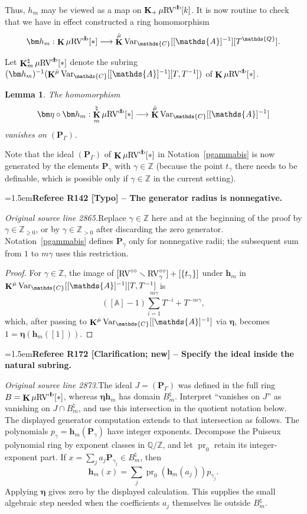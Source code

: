 \documentclass[12pt]{amsart}
\newcommand{\RefereeRemark}[4]{%
  \par\medskip\begingroup\normalfont\small\color{RefereePurple}%
  \emergencystretch=1.5em\noindent\textbf{Referee R#1 [#2] -- #3.}\par\nobreak\noindent #4\par
  \endgroup\medskip
}
\theoremstyle{plain}
\newtheorem{lem}[thm]{Lemma}
\theoremstyle{definition}
\theoremstyle{remark}
\numberwithin{equation}{section}
\theoremstyle{plain}
\newcommand{\RV}{\textup{RV}}
\newcommand{\Z}{\mathds{Z}}
\newcommand{\A}{\mathds{A}}
\newcommand{\C}{\mathds{C}}
\newcommand{\Q}{\mathds{Q}}
\newcommand{\0}{\emptyset}
\newcommand{\fun}{\longrightarrow}
\newcommand{\mi}{\smallsetminus}
\newcommand{\mgRV}{{\mu}{\RV}}
\DeclareMathOperator{\gsk}{\mathbf{K}_+}
\DeclareMathOperator{\ggk}{\mathbf{K}}
\DeclareMathOperator{\db}{d \! b}
\newcommand{\var}{\textup{Var}}
\newcommand{\gmv}{\ggk^{\hat \mu}\var_{\C}}
\begin{document}
Thus, $h_m$ may be viewed as a map on $\gsk \mgRV^{\db}[k]$. It is now routine to check that  we have in effect constructed a ring homomorphism
\[
\bm h_m : \ggk \mgRV^{\db}[*] \fun  \ggk^{\hat \mu} \var_{\C}[[\A]^{-1}][T^{\Q}].
\]

Let $\ggk^\natural_m \mgRV^{\db}[*]$ denote the subring $(\bm h_m)^{-1}(\gmv[[\A]^{-1}][T, T^{-1}])$ of $\ggk \mgRV^{\db}[*]$.

\begin{lem}\label{PG:van}
The homomorphism
\[
\bm \eta \circ \bm h_m : \ggk^\natural_m \mgRV^{\db}[*] \fun \gmv[[\A]^{-1}]
\]
vanishes on $(\bm P_{\Gamma})$.
\end{lem}
Note that the ideal $(\bm P_\Gamma)$ of $\ggk \mgRV^{\db}[*]$ in Notation~\ref{pgammabis} is now generated by the elements $\bm P_\gamma$ with $\gamma \in \Z$ (because the point $t_\gamma$ there needs to be definable, which is possible only if $\gamma \in \Z$ in the current setting).

\RefereeRemark{142}{Typo}{The generator radius is nonnegative}{%
\textit{Original source line 2865.}\quad Replace $\gamma\in\Z$ here and at the beginning of the proof by $\gamma\in\Z_{\geq0}$, or by $\gamma\in\Z_{>0}$ after discarding the zero generator. Notation~\ref{pgammabis} defines $\bm P_\gamma$ only for nonnegative radii; the subsequent sum from $1$ to $m\gamma$ uses this restriction.
}

\begin{proof}
For $\gamma \in \Z$, the image of $[\RV^{\circ \circ} \mi \RV^{\circ \circ}_{\gamma}] + [\{t_\gamma\}]$ under $\bm h_m$ in $\gmv[[\A]^{-1}][T, T^{-1}]$ is
\[
 ([\A] - 1) \sum_{i = 1}^{m\gamma} T^{-i} + T^{-m\gamma},
\]
which, after passing to $\gmv[[\A]^{-1}]$ via $\bm \eta$, becomes $1 = \bm \eta (\bm h_m([1]))$.
\end{proof}

\RefereeRemark{172}{Clarification; new}{Specify the ideal inside the natural subring}{%
\textit{Original source line 2873.}\quad The ideal $J=(\bm P_\Gamma)$ was defined in the full ring $B=\ggk\mgRV^{\db}[*]$, whereas $\bm\eta\bm h_m$ has domain $B_m^\natural$. Interpret ``vanishes on $J$'' as vanishing on $J\cap B_m^\natural$, and use this intersection in the quotient notation below. The displayed generator computation extends to that intersection as follows. The polynomials $p_\gamma=\bm h_m(\bm P_\gamma)$ have integer exponents. Decompose the Puiseux polynomial ring by exponent classes in $\Q/\Z$, and let $\operatorname{pr}_0$ retain its integer-exponent part. If $x=\sum_j a_j\bm P_{\gamma_j}\in B_m^\natural$, then
\[
 \bm h_m(x)=\sum_j\operatorname{pr}_0(\bm h_m(a_j))p_{\gamma_j}.
\]
Applying $\bm\eta$ gives zero by the displayed calculation. This supplies the small algebraic step needed when the coefficients $a_j$ themselves lie outside $B_m^\natural$.
}
\end{document}
